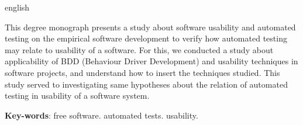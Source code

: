 
\begin{resumo}[Abstract]
  \begin{otherlanguage*}{english}  
  
This degree monograph presents a study about software usability and automated testing on the empirical software development to verify how automated testing may relate to usability of a software. For this, we conducted a study about applicability of BDD (Behaviour Driver Development) and usability techniques in software projects, and understand how to insert the techniques studied. This study served to investigating same hypotheses about the relation of automated testing in usability of a software system.



   \vspace{\onelineskip}
 
  \noindent 
  \textbf{Key-words}: free software. automated tests. usability.
  \end{otherlanguage*}
\end{resumo}


